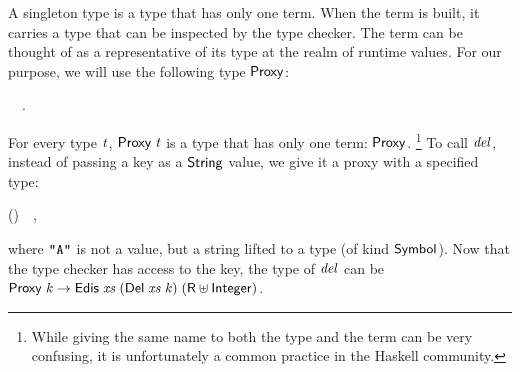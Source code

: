 A singleton type is a type that has only one term. When the term is built, it
carries a type that can be inspected by the type checker. The term can be
thought of as a representative of its type at the realm of runtime values. For
our purpose, we will use the following type \ensuremath{\Conid{Proxy}}:
\begin{hscode}\SaveRestoreHook
{}%
%
\>[B]{}\;\;\mathrel{=}~~.{}\<[E]%
\ColumnHook
\end{hscode}\resethooks
For every type \ensuremath{\Varid{t}}, \ensuremath{\Conid{Proxy}\;\Varid{t}} is a type that has only one term: \ensuremath{\Conid{Proxy}}.%
\footnote{While giving the same name to both the type and the term can be very
confusing, it is unfortunately a common practice in the Haskell community.}
To call \ensuremath{\Varid{del}}, instead of passing a key as a \ensuremath{\Conid{String}} value, we give it a proxy
with a specified type:
\begin{hscode}\SaveRestoreHook
{}%
%
\>[B]{}\;(\mathbin{::}\;)~~,{}\<[E]%
\ColumnHook
\end{hscode}\resethooks
where \ensuremath{\text{\tt \char34 A\char34}} is not a value, but a string lifted to a type (of kind \ensuremath{\Conid{Symbol}}).
Now that the type checker has access to the key, the type of \ensuremath{\Varid{del}} can be
\ensuremath{\Conid{Proxy}\;\Varid{k}\to \Conid{Edis}\;\Varid{xs}\;(\Conid{Del}\;\Varid{xs}\;\Varid{k})\;(\Conid{R} \uplus \Conid{Integer})}.

